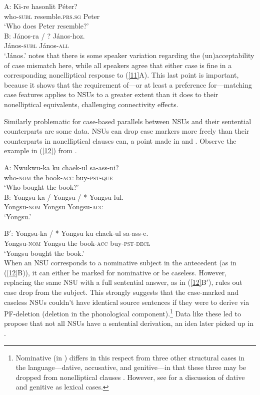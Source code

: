 \ea
A: \gll Ki-re             hasonlit         P\'{e}ter?\\
        who-\textsc{subl} resemble.\textsc{prs}.\textsc{sg}  Peter\\
   \glt  `Who does Peter resemble?'\\
B: \gll J\'{a}nos-ra / ? J\'{a}nos-hoz.\\
        J\'{a}nos-\textsc{subl} {} {} J\'{a}nos-\textsc{all}\\
\glt  `J\'{a}nos.'\label{11}
\z
%
\citet{Jacobson2016} notes that there is some speaker variation regarding the (un)ac\-cepta\-bi\-li\-ty of case mismatch here, while all speakers agree that either case is fine in a corresponding nonelliptical response to (\ref{11}A). This last point is important, because it shows that the requirement of---or at least a preference for---matching case features applies to NSUs to a greater extent than it does to their nonelliptical equivalents, challenging connectivity effects.

Similarly problematic for case-based parallels between NSUs and their sentential counterparts are some  data.  NSUs can drop case markers more freely than their counterparts in nonelliptical clauses can, a point made in \citet{Morgan1989} and \citet{Kim2015}. Observe the example in (\ref{12}) from \citet[237]{Morgan1989}.

  \ea
A: \gll Nwukwu-ka        ku  chaek-ul          sa-ass-ni?\\
        who-\textsc{nom} the book-\textsc{acc} buy-\textsc{pst}-\textsc{que}\\
\glt  `Who bought the book?'\\

B: \gll Yongsu-ka / Yongsu / * Yongsu-lul.\\
        Yongsu-\textsc{nom} {} Yongsu {} {} Yongsu-\textsc{acc}\\
\glt  `Yongsu.'

B$'$: \gll Yongsu-ka            /  *  Yongsu ku  chaek-ul          sa-ass-e.\\
           Yongsu-\textsc{nom}  {} {} Yongsu the book-\textsc{acc} buy-\textsc{pst}-\textsc{decl}\\
\glt  `Yongsu bought the book.'\\
\label{12}
\z
%
When an NSU  corresponds to a nominative subject in the antecedent (as in (\ref{12}B)), it can either be marked for nominative or be caseless.
However, replacing the same NSU  with a full sentential answer, as in (\ref{12}B$'$), rules out case drop from the subject. This strongly suggests that the case-marked and caseless NSUs couldn't have identical source sentences if they were to derive via PF-deletion (deletion in the phonological component).\footnote{Nominative (in ) differs in this respect from three other structural cases in the language---dative, accusative, and genitive---in that these three may be dropped from nonelliptical clauses \citep[see][]{Morgan1989, Lee2016, Kim2016}. However, see \citet{Mueller2002b} for a discussion of  dative and genitive as lexical cases.}  Data like these led \citet{Morgan1989} to propose that not all NSUs have a sentential derivation, an idea later picked up in \citet{Barton1998}.

